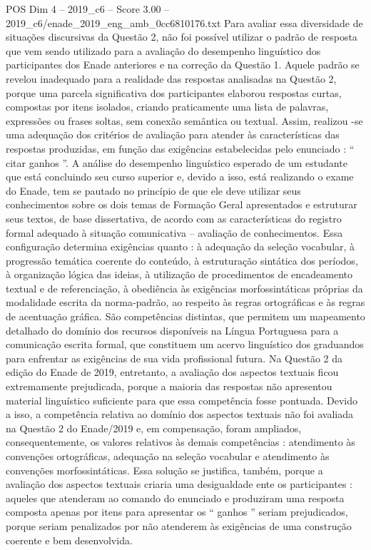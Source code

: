 \begin{textsample}{POS Dim 4 – 2019\_c6 – Score 3.00 – 2019\_c6/enade\_2019\_eng\_amb\_0cc6810176.txt}
Para avaliar essa diversidade de situações discursivas da Questão 2, não foi possível utilizar o padrão de resposta que vem sendo utilizado para a avaliação do desempenho linguístico dos participantes dos Enade anteriores e na correção da Questão 1.
Aquele padrão se revelou inadequado para a realidade das respostas analisadas na Questão 2, porque uma parcela significativa dos participantes elaborou respostas curtas, compostas por itens isolados, criando praticamente uma lista de palavras, expressões ou frases soltas, sem conexão semântica ou textual.
Assim, realizou -se uma adequação dos critérios de avaliação para atender às características das respostas produzidas, em função das exigências estabelecidas pelo enunciado : “ citar ganhos ”.
A análise do desempenho linguístico esperado de um estudante que está concluindo seu curso superior e, devido a isso, está realizando o exame do Enade, tem se pautado no princípio de que ele deve utilizar seus conhecimentos sobre os dois temas de Formação Geral apresentados e estruturar seus textos, de base dissertativa, de acordo com as características do registro formal adequado à situação comunicativa – avaliação de conhecimentos.
Essa configuração determina exigências quanto : à adequação da seleção vocabular, à progressão temática coerente do conteúdo, à estruturação sintática dos períodos, à organização lógica das ideias, à utilização de procedimentos de encadeamento textual e de referenciação, à obediência às exigências morfossintáticas próprias da modalidade escrita da norma-padrão, ao respeito às regras ortográficas e às regras de acentuação gráfica.
São competências distintas, que permitem um mapeamento detalhado do domínio dos recursos disponíveis na Língua Portuguesa para a comunicação escrita formal, que constituem um acervo linguístico dos graduandos para enfrentar as exigências de sua vida profissional futura.
Na Questão 2 da edição do Enade de 2019, entretanto, a avaliação dos aspectos textuais ficou extremamente prejudicada, porque a maioria das respostas não apresentou material linguístico suficiente para que essa competência fosse pontuada.
Devido a isso, a competência relativa ao domínio dos aspectos textuais não foi avaliada na Questão 2 do Enade/2019 e, em compensação, foram ampliados, consequentemente, os valores relativos às demais competências : atendimento às convenções ortográficas, adequação na seleção vocabular e atendimento às convenções morfossintáticas.
Essa solução se justifica, também, porque a avaliação dos aspectos textuais criaria uma desigualdade ente os participantes : aqueles que atenderam ao comando do enunciado e produziram uma resposta composta apenas por itens para apresentar os “ ganhos ” seriam prejudicados, porque seriam penalizados por não atenderem às exigências de uma construção coerente e bem desenvolvida.

\end{textsample}
